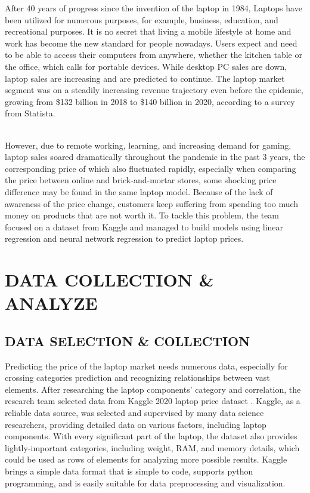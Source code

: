 \documentclass{scrartcl}
\begin{document}
After 40 years of progress since the invention of the laptop in 1984, Laptops have been utilized for numerous purposes, for example, business, education, and recreational purposes. It is no secret that living a mobile lifestyle at home and work has become the new standard for people nowadays. Users expect and need to be able to access their computers from anywhere, whether the kitchen table or the office, which calls for portable devices. While desktop PC sales are down, laptop sales are increasing and are predicted to continue. The laptop market segment was on a steadily increasing revenue trajectory even before the epidemic, growing from \$132 billion in 2018 to \$140 billion in 2020, according to a survey from Statista. \par
~\\
\noindent However, due to remote working, learning, and increasing demand for gaming, laptop sales soared dramatically throughout the pandemic in the past 3 years, the corresponding price of which also fluctuated rapidly, especially when comparing the price between online and brick-and-mortar stores, some shocking price difference may be found in the same laptop model. Because of the lack of awareness of the price change, customers keep suffering from spending too much money on products that are not worth it. To tackle this problem, the team focused on a dataset from Kaggle and managed to build models using linear regression and neural network regression \cite{chen} to predict laptop prices. 

\section{DATA COLLECTION & ANALYZE}


\subsection{DATA SELECTION & COLLECTION }
Predicting the price of the laptop market needs numerous data, especially for crossing categories prediction and recognizing relationships between vast elements. After researching the laptop components’ category and correlation, the research team selected data from Kaggle 2020 laptop price dataset \cite{kumar_2022}. Kaggle, as a reliable data source, was selected and supervised by many data science researchers, providing detailed data on various factors, including laptop components. With every significant part of the laptop, the dataset also provides lightly-important categories, including weight, RAM, and memory details, which could be used as rows of elements for analyzing more possible results. Kaggle brings a simple data format that is simple to code, supports python programming, and is easily suitable for data preprocessing and visualization. \par
\end{document}
